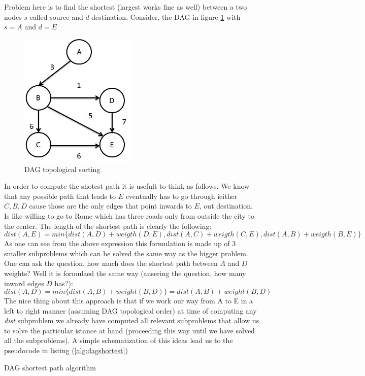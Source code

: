 Problem here is to find the shortest (largest works fine as well) between a two nodes $s$ called source and $d$ destination.
Consider, the DAG in figure \ref{fig:dagexample} with $s=A$ and $d=E$
	\begin{figure}
	\label{fig:dagexample}
	\centering
	\includegraphics[width=0.5\textwidth]{../images/dagexample}
	\caption{DAG topological sorting}
	\end{figure}
In order to compute the shotest path it is usefult to think as follows. We know that any possible path that leads to $E$ eventually has to go through ieither $C,B,D$ cause those are the only edges that point inwards to $E$, out destination.
Is like willing to go to Rome which has three roads only  from outside the city to the center.
The length of the shortest path is clearly the following:
\[
	dist(A,E) = min\{dist(A,D)+weigth(D,E), dist(A,C)+weigth(C,E), dist(A,B)+weigth(B,E)\}
\]
As one can see from the above expression this formulation is made up of 3 smaller subproblems which can be solved the same way as the bigger problem.
One can ask the question, how much does the shortest path between $A$ and $D$ weights? Well it is formulaed the same way (ansering the question, how many inward edges $D$ has?):
\[
dist(A,D) = min\{dist(A,B) + weight(B,D)\} = dist(A,B) + weight(B,D)
\]
The nice thing about this approach is that if we work our way from A to E in a left to right manner (assuming DAG topological order) at time of computing any \textit{dist} subproblem we already have computed all relevant subproblems that allow us to solve the particular istance at hand (proceeding this way until we have solved all the subproblems).
A simple schematization of this ideas lead us to the pseudocode in listing (\ref{alg:dagshortest})
\begin{algorithm}\label{alg:dagshortest}
\caption{DAG shortest path algorithm}
\end{algorithm}

